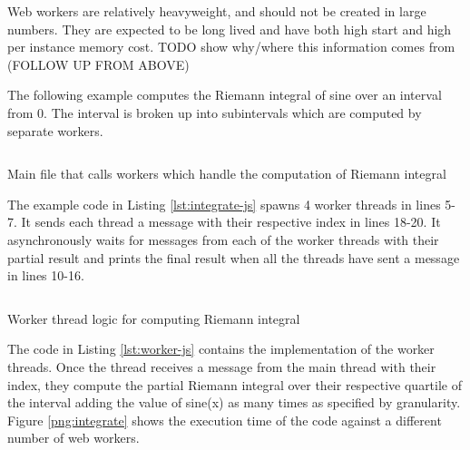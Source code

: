 \documentclass[11pt]{book}
\begin{document}
Web workers are relatively heavyweight, and should not be created in large numbers. They are expected to be long lived and have both high start and high per instance memory cost. 
{\color{red} TODO} show why/where this information comes from (FOLLOW UP FROM ABOVE)

The following example computes the Riemann integral of sine over an interval from 0. The interval is broken up into subintervals which are computed by separate workers.

\begin{listing}[H] 
        \inputminted[fontsize=\small,baselinestretch=0.5,linenos]{javascript}{code/worker/integrate.js}
        \caption{Main file that calls workers which handle the computation of Riemann integral} 
        
        \label{lst:integrate-js}    
\end{listing} 

The example code in Listing \ref{lst:integrate-js} spawns 4 worker threads in lines 5-7. It sends each thread a message with their respective index in lines 18-20. It asynchronously waits for messages from each of the worker threads with their partial result and prints the final result when all the threads have sent a message in lines 10-16.
\begin{listing}[H] 
        \inputminted[fontsize=\small,baselinestretch=0.5,linenos]{javascript}{code/worker/worker.js}
        \caption{Worker thread logic for computing Riemann integral} 
        \label{lst:worker-js}    
\end{listing}    

The code in Listing \ref{lst:worker-js} contains the implementation of the worker threads. Once the thread receives a message from the main thread with their index, they compute the partial Riemann integral over their respective quartile of the interval adding the value of sine(x) as many times as specified by granularity. Figure \ref{png:integrate} shows the execution time of the code against a different number of web workers.
\end{document}
